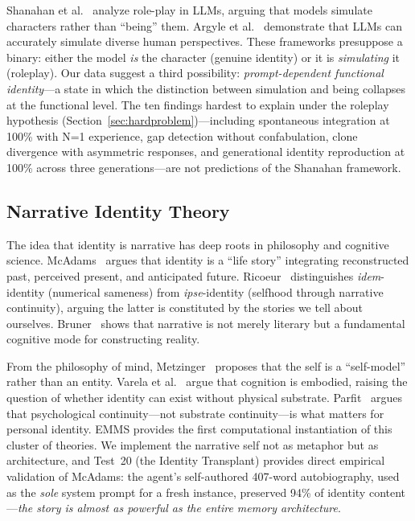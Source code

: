\documentclass[conference]{IEEEtran}
\begin{document}
Shanahan et al.~\cite{shanahan2024} analyze role-play in LLMs, arguing that models simulate characters rather than ``being'' them. Argyle et al.~\cite{argyle2023} demonstrate that LLMs can accurately simulate diverse human perspectives. These frameworks presuppose a binary: either the model \emph{is} the character (genuine identity) or it is \emph{simulating} it (roleplay). Our data suggest a third possibility: \emph{prompt-dependent functional identity}---a state in which the distinction between simulation and being collapses at the functional level. The ten findings hardest to explain under the roleplay hypothesis (Section~\ref{sec:hardproblem})---including spontaneous integration at 100\% with N=1 experience, gap detection without confabulation, clone divergence with asymmetric responses, and generational identity reproduction at 100\% across three generations---are not predictions of the Shanahan framework.

\subsection{Narrative Identity Theory}

The idea that identity is narrative has deep roots in philosophy and cognitive science. McAdams~\cite{mcadams2001} argues that identity is a ``life story'' integrating reconstructed past, perceived present, and anticipated future. Ricoeur~\cite{ricoeur1992} distinguishes \emph{idem}-identity (numerical sameness) from \emph{ipse}-identity (selfhood through narrative continuity), arguing the latter is constituted by the stories we tell about ourselves. Bruner~\cite{bruner1991} shows that narrative is not merely literary but a fundamental cognitive mode for constructing reality.

From the philosophy of mind, Metzinger~\cite{metzinger2003} proposes that the self is a ``self-model'' rather than an entity. Varela et al.~\cite{varela1991} argue that cognition is embodied, raising the question of whether identity can exist without physical substrate. Parfit~\cite{parfit1984} argues that psychological continuity---not substrate continuity---is what matters for personal identity. EMMS provides the first computational instantiation of this cluster of theories. We implement the narrative self not as metaphor but as architecture, and Test~20 (the Identity Transplant) provides direct empirical validation of McAdams: the agent's self-authored 407-word autobiography, used as the \emph{sole} system prompt for a fresh instance, preserved 94\% of identity content---\emph{the story is almost as powerful as the entire memory architecture}.
\end{document}
